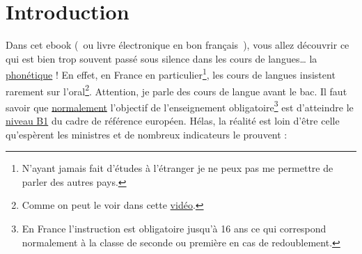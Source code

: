 \chapter{Introduction}\label{chap:intro}
\minitoc

Dans cet ebook (~ou livre électronique en bon français~), vous allez
découvrir ce qui est bien trop souvent passé sous silence dans les
cours de langues\ldots{} la \underline{phonétique} ! En effet, en France en
particulier\footnote{N'ayant jamais fait d'études à l'étranger je ne
  peux pas me permettre de parler des autres pays.}, les cours de
langues insistent rarement sur l'oral\footnote{Comme on peut le voir dans cette \href{http://doyouspeakenglish.fr/les-francais-savent-ils-parler-anglais/}{vidéo}.}. Attention, je parle des cours
de langue avant le bac. Il faut savoir que \underline{normalement}
l'objectif de l'enseignement obligatoire\footnote{En France
  l'instruction est obligatoire jusqu'à 16 ans ce qui correspond
  normalement à la classe de seconde ou première en cas de
  redoublement.} est d'atteindre le
\href{http://doyouspeakenglish.fr/quel-niveau-danglais-avez-vous/}{niveau
  B1} du cadre de référence européen. Hélas, la réalité est
loin d'être celle qu'espèrent les ministres et de nombreux indicateurs le prouvent :
